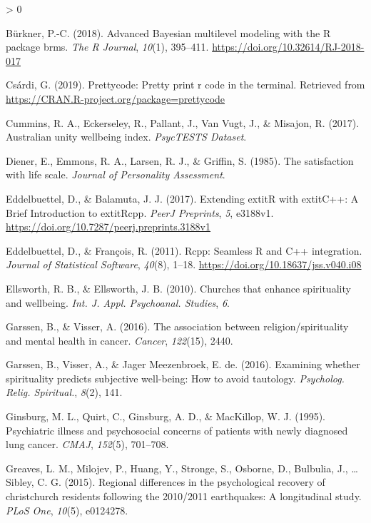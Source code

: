 \documentclass[
  english,
  man,floatsintext]{apa6}
\newlength{\cslhangindent}
\newenvironment{CSLReferences}[2] %
 {%
  \setlength{\parindent}{0pt}
  \ifodd #1 \everypar{\setlength{\hangindent}{\cslhangindent}}\ignorespaces\fi
  \ifnum #2 > 0
  \setlength{\parskip}{#2\baselineskip}
  \fi
 }%
 {}
\begin{document}
\begin{CSLReferences}{1}{0}
\leavevmode\hypertarget{ref-BRMSpackage}{}%
Bürkner, P.-C. (2018). Advanced {Bayesian} multilevel modeling with the {R} package {brms}. \emph{The R Journal}, \emph{10}(1), 395--411. \url{https://doi.org/10.32614/RJ-2018-017}

\leavevmode\hypertarget{ref-R-prettycode}{}%
Csárdi, G. (2019). Prettycode: Pretty print r code in the terminal. Retrieved from \url{https://CRAN.R-project.org/package=prettycode}

\leavevmode\hypertarget{ref-Cummins2017-ur}{}%
Cummins, R. A., Eckerseley, R., Pallant, J., Van Vugt, J., \& Misajon, R. (2017). Australian unity wellbeing index. \emph{PsycTESTS Dataset}.

\leavevmode\hypertarget{ref-Diener1985-xy}{}%
Diener, E., Emmons, R. A., Larsen, R. J., \& Griffin, S. (1985). The satisfaction with life scale. \emph{Journal of Personality Assessment}.

\leavevmode\hypertarget{ref-R-Rcpp_b}{}%
Eddelbuettel, D., \& Balamuta, J. J. (2017). {Extending extit{R} with extit{C++}: A Brief Introduction to extit{Rcpp}}. \emph{PeerJ Preprints}, \emph{5}, e3188v1. \url{https://doi.org/10.7287/peerj.preprints.3188v1}

\leavevmode\hypertarget{ref-R-Rcpp_a}{}%
Eddelbuettel, D., \& François, R. (2011). {Rcpp}: Seamless {R} and {C++} integration. \emph{Journal of Statistical Software}, \emph{40}(8), 1--18. \url{https://doi.org/10.18637/jss.v040.i08}

\leavevmode\hypertarget{ref-Ellsworth2010-yu}{}%
Ellsworth, R. B., \& Ellsworth, J. B. (2010). Churches that enhance spirituality and wellbeing. \emph{Int. J. Appl. Psychoanal. Studies}, \emph{6}.

\leavevmode\hypertarget{ref-Garssen2016-km}{}%
Garssen, B., \& Visser, A. (2016). The association between religion/spirituality and mental health in cancer. \emph{Cancer}, \emph{122}(15), 2440.

\leavevmode\hypertarget{ref-Garssen2016-kb}{}%
Garssen, B., Visser, A., \& Jager Meezenbroek, E. de. (2016). Examining whether spirituality predicts subjective well-being: How to avoid tautology. \emph{Psycholog. Relig. Spiritual.}, \emph{8}(2), 141.

\leavevmode\hypertarget{ref-Ginsburg1995-jr}{}%
Ginsburg, M. L., Quirt, C., Ginsburg, A. D., \& MacKillop, W. J. (1995). Psychiatric illness and psychosocial concerns of patients with newly diagnosed lung cancer. \emph{CMAJ}, \emph{152}(5), 701--708.

\leavevmode\hypertarget{ref-greaves2015regional}{}%
Greaves, L. M., Milojev, P., Huang, Y., Stronge, S., Osborne, D., Bulbulia, J., \ldots{} Sibley, C. G. (2015). Regional differences in the psychological recovery of christchurch residents following the 2010/2011 earthquakes: A longitudinal study. \emph{PLoS One}, \emph{10}(5), e0124278.


\end{CSLReferences}
\end{document}
